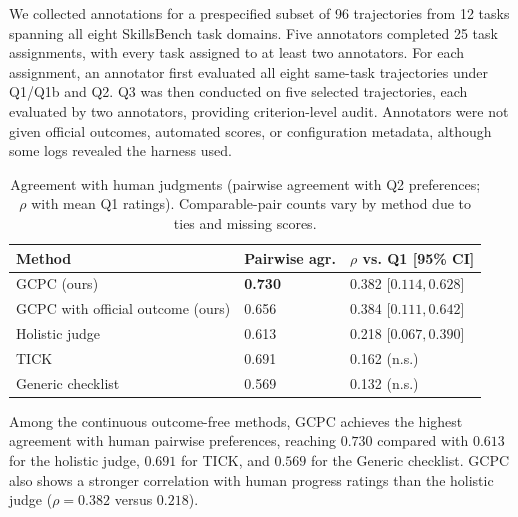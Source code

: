 \documentclass[sigconf,nonacm]{acmart}
\begin{document}
We collected annotations for a prespecified subset of 96 trajectories from
12 tasks spanning all eight SkillsBench task domains. Five annotators completed
25 task assignments, with every task assigned to at least two annotators. For
each assignment, an annotator first evaluated all eight same-task trajectories
under Q1/Q1b and Q2. Q3 was then conducted on five selected
trajectories, each evaluated by two annotators, providing 
criterion-level audit. Annotators were not given official outcomes, automated scores, or
configuration metadata, although some logs revealed the harness used.
\begin{table}[t]
\centering
\small
\caption{Agreement with human judgments (pairwise agreement with Q2
preferences; $\rho$ with mean Q1 ratings). Comparable-pair counts vary by
method due to ties and missing scores.}
\label{tab:human}
\begin{tabular}{@{}lll@{}}
\toprule
Method & Pairwise agr. & $\rho$ vs. Q1 [95\% CI] \\
\midrule
GCPC (ours) & \textbf{0.730} & 0.382 [$0.114,0.628$] \\
GCPC with official outcome (ours) & 0.656 & 0.384 [$0.111,0.642$] \\
Holistic judge & 0.613 & 0.218 [$0.067,0.390$] \\
TICK & 0.691 & 0.162 (n.s.) \\
Generic checklist & 0.569 & 0.132 (n.s.) \\
\bottomrule
\end{tabular}
\end{table}

Among the continuous outcome-free methods, GCPC achieves the highest agreement with
human pairwise preferences, reaching $0.730$ compared with $0.613$ for
the holistic judge, $0.691$ for TICK, and $0.569$ for the Generic checklist. GCPC also shows a stronger correlation with human progress ratings than the
holistic judge ($\rho=0.382$ versus $0.218$). 
\end{document}
